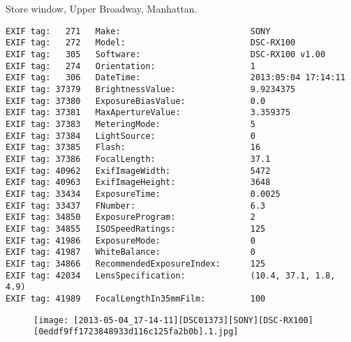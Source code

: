 \section{\protect{}}
\noindent Store window, Upper Broadway, Manhattan.
\noindent
\begin{lstlisting}
EXIF tag:   271   Make:                          SONY
EXIF tag:   272   Model:                         DSC-RX100
EXIF tag:   305   Software:                      DSC-RX100 v1.00
EXIF tag:   274   Orientation:                   1
EXIF tag:   306   DateTime:                      2013:05:04 17:14:11
EXIF tag: 37379   BrightnessValue:               9.9234375
EXIF tag: 37380   ExposureBiasValue:             0.0
EXIF tag: 37381   MaxApertureValue:              3.359375
EXIF tag: 37383   MeteringMode:                  5
EXIF tag: 37384   LightSource:                   0
EXIF tag: 37385   Flash:                         16
EXIF tag: 37386   FocalLength:                   37.1
EXIF tag: 40962   ExifImageWidth:                5472
EXIF tag: 40963   ExifImageHeight:               3648
EXIF tag: 33434   ExposureTime:                  0.0025
EXIF tag: 33437   FNumber:                       6.3
EXIF tag: 34850   ExposureProgram:               2
EXIF tag: 34855   ISOSpeedRatings:               125
EXIF tag: 41986   ExposureMode:                  0
EXIF tag: 41987   WhiteBalance:                  0
EXIF tag: 34866   RecommendedExposureIndex:      125
EXIF tag: 42034   LensSpecification:             (10.4, 37.1, 1.8, 4.9)
EXIF tag: 41989   FocalLengthIn35mmFilm:         100

\end{lstlisting}
\clearpage
\begin{figure}
\raggedleft
\texttt{[image: [2013-05-04\_17-14-11][DSC01373][SONY][DSC-RX100][0eddf9ff1723848933d116c125fa2b0b].1.jpg]}
\end{figure}


\clearpage
